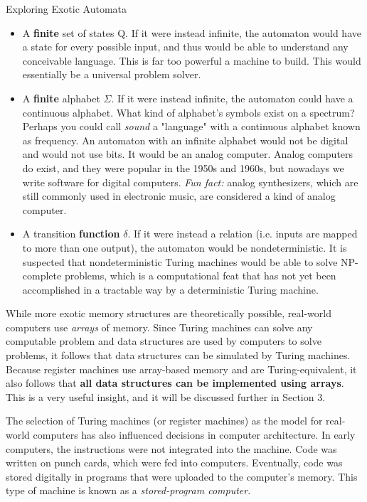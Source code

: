 \begin{bluebox}{Exploring Exotic Automata}
    \vspace{4mm}
    \begin{itemize}
        \item A \textbf{finite} set of states Q. If it were instead infinite, the automaton would have a state for every possible input, and thus would be able to understand any conceivable language. This is far too powerful a machine to build. This would essentially be a universal problem solver.
        \item A \textbf{finite} alphabet $\Sigma$. If it were instead infinite, the automaton could have a continuous alphabet. What kind of alphabet's symbols exist on a spectrum? Perhaps you could call \textit{sound} a "language" with a continuous alphabet known as frequency. An automaton with an infinite alphabet would not be digital and would not use bits. It would be an analog computer. Analog computers do exist, and they were popular in the 1950s and 1960s, but nowadays we write software for digital computers. \textit{Fun fact:} analog synthesizers, which are still commonly used in electronic music, are considered a kind of analog computer.
        \item A transition \textbf{function} $\delta$. If it were instead a relation (i.e. inputs are mapped to more than one output), the automaton would be nondeterministic. It is suspected that nondeterministic Turing machines would be able to solve NP-complete problems, which is a computational feat that has not yet been accomplished in a tractable way by a deterministic Turing machine.
    \end{itemize}
    \vspace{4mm}

\end{bluebox}

While more exotic memory structures are theoretically possible, real-world computers use \textit{arrays} of memory. Since Turing machines can solve any computable problem and data structures are used by computers to solve problems, it follows that data structures can be simulated by Turing machines. Because register machines use array-based memory and are Turing-equivalent, it also follows that \textbf{all data structures can be implemented using arrays}. This is a very useful insight, and it will be discussed further in Section 3.

The selection of Turing machines (or register machines) as the model for real-world computers has also influenced decisions in computer architecture. In early computers, the instructions were not integrated into the machine. Code was written on punch cards, which were fed into computers. Eventually, code was stored digitally in programs that were uploaded to the computer's memory. This type of machine is known as a \textit{stored-program computer}.

